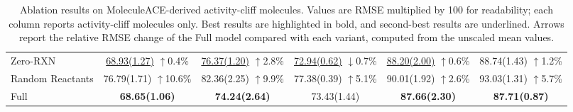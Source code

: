 \begin{table}[t]
\begin{tabular}{lccccc}
Zero-RXN & \shortstack{\underline{68.93(1.27)}\\$\uparrow$0.4\%} & \shortstack{\underline{76.37(1.20)}\\$\uparrow$2.8\%} & \shortstack{\underline{72.94(0.62)}\\$\downarrow$0.7\%} & \shortstack{\underline{88.20(2.00)}\\$\uparrow$0.6\%} & \shortstack{88.74(1.43)\\$\uparrow$1.2\%} \\

Random Reactants & \shortstack{76.79(1.71)\\$\uparrow$10.6\%} & \shortstack{82.36(2.25)\\$\uparrow$9.9\%} & \shortstack{77.38(0.39)\\$\uparrow$5.1\%} & \shortstack{90.01(1.92)\\$\uparrow$2.6\%} & \shortstack{93.03(1.31)\\$\uparrow$5.7\%} \\

Full & \textbf{68.65(1.06)} & \textbf{74.24(2.64)} & 73.43(1.44) & \textbf{87.66(2.30)} & \textbf{87.71(0.87)} \\
\hline
\end{tabular}
\caption{Ablation results on MoleculeACE-derived activity-cliff molecules. Values are RMSE multiplied by 100 for readability; each column reports activity-cliff molecules only. Best results are highlighted in bold, and second-best results are underlined. Arrows report the relative RMSE change of the Full model compared with each variant, computed from the unscaled mean values.}
\label{tab:clif_ablation}
\end{table}
